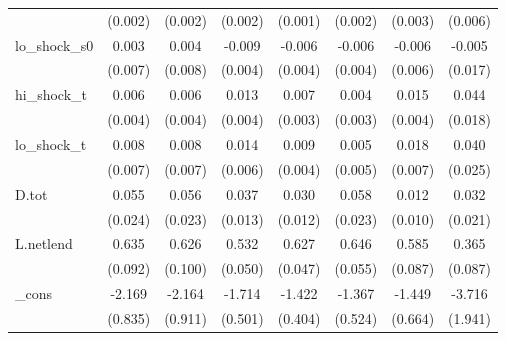 {\begin{tabular}{l*{7}{c}}
            &     (0.002)         &     (0.002)         &     (0.002)         &     (0.001)         &     (0.002)         &     (0.003)         &     (0.006)         \\
\addlinespace
lo\_shock\_s0 &       0.003         &       0.004         &      -0.009\sym{**} &      -0.006         &      -0.006         &      -0.006         &      -0.005         \\
            &     (0.007)         &     (0.008)         &     (0.004)         &     (0.004)         &     (0.004)         &     (0.006)         &     (0.017)         \\
\addlinespace
hi\_shock\_t  &       0.006         &       0.006         &       0.013\sym{***}&       0.007\sym{**} &       0.004         &       0.015\sym{***}&       0.044\sym{**} \\
            &     (0.004)         &     (0.004)         &     (0.004)         &     (0.003)         &     (0.003)         &     (0.004)         &     (0.018)         \\
\addlinespace
lo\_shock\_t  &       0.008         &       0.008         &       0.014\sym{**} &       0.009\sym{**} &       0.005         &       0.018\sym{**} &       0.040         \\
            &     (0.007)         &     (0.007)         &     (0.006)         &     (0.004)         &     (0.005)         &     (0.007)         &     (0.025)         \\
\addlinespace
D.tot       &       0.055\sym{**} &       0.056\sym{**} &       0.037\sym{***}&       0.030\sym{**} &       0.058\sym{**} &       0.012         &       0.032         \\
            &     (0.024)         &     (0.023)         &     (0.013)         &     (0.012)         &     (0.023)         &     (0.010)         &     (0.021)         \\
\addlinespace
L.netlend   &       0.635\sym{***}&       0.626\sym{***}&       0.532\sym{***}&       0.627\sym{***}&       0.646\sym{***}&       0.585\sym{***}&       0.365\sym{***}\\
            &     (0.092)         &     (0.100)         &     (0.050)         &     (0.047)         &     (0.055)         &     (0.087)         &     (0.087)         \\
\addlinespace
\_cons      &      -2.169\sym{**} &      -2.164\sym{**} &      -1.714\sym{***}&      -1.422\sym{***}&      -1.367\sym{**} &      -1.449\sym{**} &      -3.716\sym{*}  \\
            &     (0.835)         &     (0.911)         &     (0.501)         &     (0.404)         &     (0.524)         &     (0.664)         &     (1.941)         \\

\end{tabular}}
